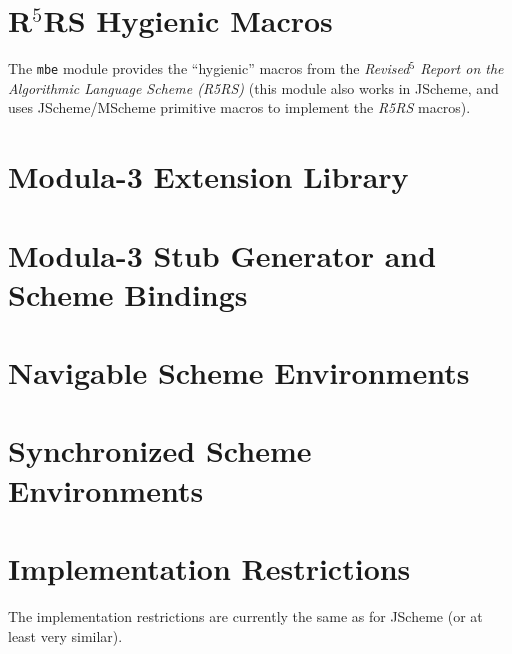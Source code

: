 \section{R$^5$RS Hygienic Macros}

The {\tt mbe} module provides the ``hygienic'' macros from the {\it
  Revised$^5$ Report on the Algorithmic Language Scheme (R5RS)\/}
(this module also works in JScheme, and uses JScheme/MScheme primitive
macros to implement the {\it R5RS} macros).

\section{Modula-3 Extension Library}

\section{Modula-3 Stub Generator and Scheme Bindings}

\section{Navigable Scheme Environments}

\section{Synchronized Scheme Environments}

\section{Implementation Restrictions}

The implementation restrictions are currently the same as for JScheme (or at least very similar).

